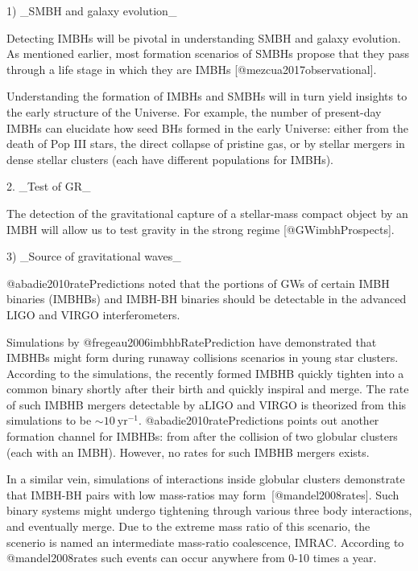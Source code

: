 {{{{1) _SMBH and galaxy evolution_

    Detecting IMBHs will be pivotal in understanding SMBH and galaxy
    evolution. As mentioned earlier, most formation scenarios of SMBHs
    propose that they pass through a life stage in which they are IMBHs
    [@mezcua2017observational].

    Understanding the formation of IMBHs and SMBHs will in turn yield
    insights to the early structure of the Universe. For example, the
    number of present-day IMBHs can elucidate how seed BHs formed in the
    early Universe: either from the death of Pop III stars, the direct
    collapse of pristine gas, or by stellar mergers in dense stellar
    clusters (each have different populations for IMBHs).


2. _Test of GR_

    The detection of the gravitational capture of a stellar-mass compact
    object by an IMBH will allow us to test gravity in the strong regime
    [@GWimbhProspects].



3) _Source of gravitational waves_

    @abadie2010ratePredictions noted that the portions of GWs of certain
    IMBH binaries (IMBHBs) and IMBH-BH binaries should be detectable in
    the advanced LIGO and VIRGO interferometers.

    Simulations by @fregeau2006imbhbRatePrediction have demonstrated
    that IMBHBs might form during runaway collisions scenarios in young
    star clusters. According to the simulations, the recently formed
    IMBHB quickly tighten into a common binary shortly after their birth
    and quickly inspiral and merge. The rate of such IMBHB mergers
    detectable by aLIGO and VIRGO is theorized from this simulations to
    be $\sim10\ \text{yr}^{-1}$. @abadie2010ratePredictions points
    out another formation channel for IMBHBs: from after the
    collision of two globular clusters (each with an IMBH). However,
    no rates for such IMBHB mergers exists.

    In a similar vein, simulations of interactions inside globular
    clusters demonstrate that IMBH-BH pairs with low mass-ratios may
    form~[@mandel2008rates]. Such binary systems might undergo
    tightening through various three body interactions, and eventually
    merge. Due to the extreme mass ratio of this scenario, the scenerio
    is named an intermediate mass-ratio coalescence, IMRAC. According to
    @mandel2008rates such events can occur anywhere from 0-10 times a
    year.

}}}}
